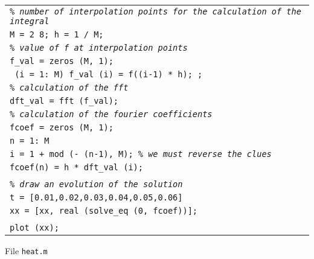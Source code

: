 \begin{listing} \begin{footnotesize} 
\noindent
{\upshape
\begin{tabular}{l} \texttt{\textit{\% number of interpolation points for the calculation of the integral}} \\
\texttt{M = 2{\hatverb} 8; h = 1 / M;} \\
\texttt{\textit{\% value of f at interpolation points}} \\
\texttt{f\_val = zeros (M, 1);} \\
\texttt{\pfor{} (i = 1: M) f\_val (i) = f((i-1) * h); \pend{};} \\
\texttt{\textit{\% calculation of the fft}} \\
\texttt{dft\_val = fft (f\_val);} \\
\texttt{\textit{\% calculation of the fourier coefficients}} \\
\texttt{fcoef = zeros (M, 1);} \\
\texttt{\pfor n = 1: M} \\
\quad \texttt{i = 1 + mod (- (n-1), M); \textit{\% we must reverse the clues}} \\
\quad \texttt{fcoef(n) = h * dft\_val (i);} \\
\texttt{\pend} \\
\texttt{\textit{\% draw an evolution of the solution}} \\
\texttt{\pfor t = [0.01,0.02,0.03,0.04,0.05,0.06]} \\
\quad \texttt{xx = [xx, real (solve\_eq (0, fcoef))];} \\
\texttt{\pend} \\
\texttt{plot (xx);} \\
\end{tabular}
}
\noindent \end{footnotesize}
\caption{File \texttt{heat.m}}
\label{heat-listing}
\end{listing}

